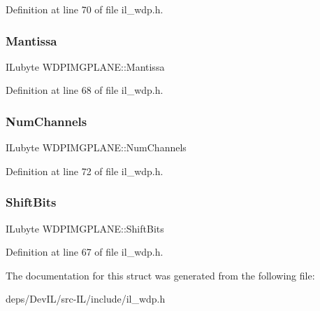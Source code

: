 Definition at line 70 of file il\+\_\+wdp.\+h.

\mbox{\label{structWDPIMGPLANE_a37ec1fe89b06b805fa203cd5b74fe1bd}} 
\subsubsection{\texorpdfstring{Mantissa}{Mantissa}}
{\footnotesize\ttfamily I\+Lubyte W\+D\+P\+I\+M\+G\+P\+L\+A\+N\+E\+::\+Mantissa}



Definition at line 68 of file il\+\_\+wdp.\+h.

\mbox{\label{structWDPIMGPLANE_a9a0b3e11e6d54876a4c73edd332f7074}} 
\subsubsection{\texorpdfstring{Num\+Channels}{NumChannels}}
{\footnotesize\ttfamily I\+Lubyte W\+D\+P\+I\+M\+G\+P\+L\+A\+N\+E\+::\+Num\+Channels}



Definition at line 72 of file il\+\_\+wdp.\+h.

\mbox{\label{structWDPIMGPLANE_a020ac80d9a05895decf9cee0c991edce}} 
\subsubsection{\texorpdfstring{Shift\+Bits}{ShiftBits}}
{\footnotesize\ttfamily I\+Lubyte W\+D\+P\+I\+M\+G\+P\+L\+A\+N\+E\+::\+Shift\+Bits}



Definition at line 67 of file il\+\_\+wdp.\+h.



The documentation for this struct was generated from the following file\+:\begin{DoxyCompactItemize}
\item 
deps/\+Dev\+I\+L/src-\/\+I\+L/include/il\+\_\+wdp.\+h\end{DoxyCompactItemize}
